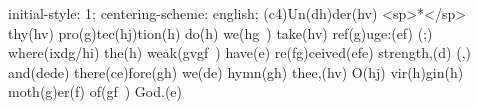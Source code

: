 initial-style: 1;
centering-scheme: english;
(c4)Un(dh)der(hv) <sp>*</sp> thy(hv) pro(g)tec(hj)tion(h) do(h) we(hg~) take(hv) ref(g)uge:(ef) (;) where(ixdg/hi) the(h) weak(gvgf~) have(e) re(fg)ceived(efe) strength,(d) (,) and(dede) there(ce)fore(gh) we(de) hymn(gh) thee,(hv) O(hj) vir(h)gin(h) moth(g)er(f) of(gf~) God.(e)
